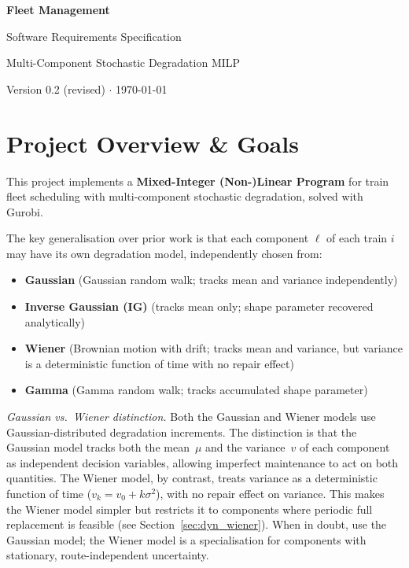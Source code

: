 \documentclass[11pt,a4paper]{article}
\begin{document}
\begin{titlepage}
  \centering
  \vspace*{3cm}
  {\Huge\bfseries Fleet Management\par}
  \vspace{0.5cm}
  {\Large Software Requirements Specification\par}
  \vspace{0.3cm}
  {\large Multi-Component Stochastic Degradation MILP\par}
  \vspace{1cm}
  {\large Version 0.2 (revised) $\cdot$ \today\par}
\end{titlepage}

\tableofcontents
\newpage

\section{Project Overview \& Goals}

This project implements a \textbf{Mixed-Integer (Non-)Linear Program} for train fleet
scheduling with multi-component stochastic degradation, solved with Gurobi.

The key generalisation over prior work is that each component $\ell$ of each train $i$
may have its own degradation model, independently chosen from:
\begin{itemize}
  \item \textbf{Gaussian} (Gaussian random walk; tracks mean and variance independently)
  \item \textbf{Inverse Gaussian (IG)} (tracks mean only; shape parameter recovered analytically)
  \item \textbf{Wiener} (Brownian motion with drift; tracks mean and variance, but variance
        is a deterministic function of time with no repair effect)
  \item \textbf{Gamma} (Gamma random walk; tracks accumulated shape parameter)
\end{itemize}

\emph{Gaussian vs.\ Wiener distinction.}
Both the Gaussian and Wiener models use Gaussian-distributed degradation increments.
The distinction is that the Gaussian model tracks both the mean~$\mu$ and the
variance~$v$ of each component as independent decision variables, allowing imperfect
maintenance to act on both quantities. The Wiener model, by contrast, treats variance
as a deterministic function of time ($v_k = v_0 + k\sigma^2$), with no repair effect
on variance. This makes the Wiener model simpler but restricts it to components where
periodic full replacement is feasible (see Section~\ref{sec:dyn_wiener}). When in
doubt, use the Gaussian model; the Wiener model is a specialisation for components
with stationary, route-independent uncertainty.
\end{document}
